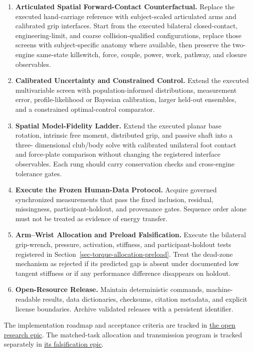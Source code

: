 \documentclass[
  letterpaper,
]{report}
\providecommand{\tightlist}{%
  \setlength{\itemsep}{0pt}\setlength{\parskip}{0pt}}
\begin{document}
\begin{enumerate}
\def\labelenumi{\arabic{enumi}.}
\tightlist
\item
  \textbf{Articulated Spatial Forward-Contact Counterfactual.} Replace
  the executed hand-carriage reference with subject-scaled articulated
  arms and calibrated grip interfaces. Start from the executed bilateral
  closed-contact, engineering-limit, and coarse collision-qualified
  configurations, replace those screens with subject-specific anatomy
  where available, then preserve the two-engine same-state killswitch,
  force, couple, power, work, pathway, and closure observables.
\item
  \textbf{Calibrated Uncertainty and Constrained Control.} Extend the
  executed multivariable screen with population-informed distributions,
  measurement error, profile-likelihood or Bayesian calibration, larger
  held-out ensembles, and a constrained optimal-control comparator.
\item
  \textbf{Spatial Model-Fidelity Ladder.} Extend the executed planar
  base rotation, intrinsic free moment, distributed grip, and passive
  shaft into a three- dimensional club/body solve with calibrated
  unilateral foot contact and force-plate comparison without changing
  the registered interface observables. Each rung should carry
  conservation checks and cross-engine tolerance gates.
\item
  \textbf{Execute the Frozen Human-Data Protocol.} Acquire governed
  synchronized measurements that pass the fixed inclusion, residual,
  missingness, participant-holdout, and provenance gates. Sequence order
  alone must not be treated as evidence of energy transfer.
\item
  \textbf{Arm--Wrist Allocation and Preload Falsification.} Execute the
  bilateral grip-wrench, pressure, activation, stiffness, and
  participant-holdout tests registered in
  Section~\ref{sec-torque-allocation-preload}. Treat the dead-zone
  mechanism as rejected if its predicted gap is absent under documented
  low tangent stiffness or if any performance difference disappears on
  holdout.
\item
  \textbf{Open-Resource Release.} Maintain deterministic commands,
  machine-readable results, data dictionaries, checksums, citation
  metadata, and explicit license boundaries. Archive validated releases
  with a persistent identifier.
\end{enumerate}

The implementation roadmap and acceptance criteria are tracked in
\href{https://github.com/D-sorganization/UpstreamDrift/issues/8426}{the
open research epic}. The matched-task allocation and transmission
program is tracked separately in
\href{https://github.com/D-sorganization/UpstreamDrift/issues/8497}{its
falsification epic}.
\end{document}
